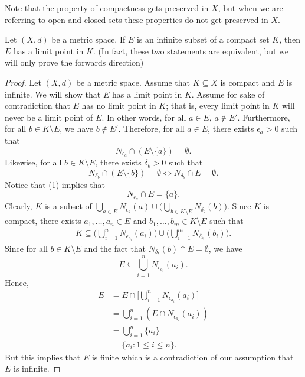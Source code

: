 \documentclass[a4paper]{report}
\begin{document}
Note that the property of compactness gets preserved in \( X  \), but when we are referring to open and closed sets these properties do not get preserved in \( X  \).

\begin{theorem}[ ]\label{Theorem 2.37}
   Let \( (X,d) \) be a metric space. If \( E  \) is an infinite subset of a compact set \( K  \), then \( E  \) has a limit point in \( K  \). (In fact, these two statements are equivalent, but we will only prove the forwards direction)
\end{theorem}
\begin{proof}
    Let \( (X,d) \) be a metric space. Assume that \( K \subseteq  X  \) is compact and \( E  \) is infinite. We will show that \( E  \) has a limit point in \( K  \). Assume for sake of contradiction that \( E  \) has no limit point in \( K  \); that is, every limit point in \( K \) will never be a limit point of \( E  \). In other words, for all \( a \in E  \), \( a \notin E' \). Furthermore, for all \( b \in K \setminus  E   \), we have \( b \notin E' \). Therefore, for all \( a \in E  \), there exists \( \epsilon_a > 0  \) such that 
    \[  {N}_{{\epsilon}_{a}} \cap (E \setminus  \{ a \} ) = \emptyset. \tag{1} \]
    Likewise, for all \( b \in K \setminus  E  \), there exists \( \delta_b  > 0  \) such that 
    \[  {N}_{{\delta}_{b}} \cap (E \setminus  \{ b \} ) = \emptyset \iff {N}_{{\delta}_{b}} \cap E = \emptyset. \tag{2} \]
Notice that (1) implies that 
\[  {N}_{{\epsilon}_{a}} \cap E = \{ a \}. \]
Clearly, \( K  \) is a subset of \( \bigcup_{ a \in E  }^{  }  {N}_{{\epsilon}_{a}} (a) \cup \Big(  \bigcup_{ b \in K \setminus  E  }^{  } {N}_{{\delta}_{b}}(b) \Big) \). Since \( K \) is compact, there exists \( {a}_{1}, \dots, {a}_{n} \in E  \) and \( {b}_{1}, \dots, {b}_{m} \in K \setminus  E  \) such that 
\begin{align*}
   K \subseteq  \Big(  \bigcup_{ i=1  }^{ n }  {N}_{{\epsilon}_{{a}_{i}}}({a}_{i}) \Big) \cup \Big(  \bigcup_{ i=1  }^{ m  } {N}_{{\delta}_{{b}_{i}}}({b}_{i}) \Big). 
\end{align*}
Since for all \( b \in K \setminus  E  \) and the fact that \( {N}_{{\delta}_{b}}(b) \cap E = \emptyset \), we have 
\[  E \subseteq \bigcup_{ i =1  }^{ n }  {N}_{{\epsilon}_{{a}_{i}}}({a}_{i}). \]
Hence, 
\begin{align*}
    E &= E \cap \Big[ \bigcup_{ i=1  }^{ n }  {N}_{{\epsilon}_{{a}_{i}}} ({a}_{i}) \Big]  \\
      &=  \bigcup_{ i=1  }^{ n }  ( E \cap {N}_{{\epsilon}_{{a}_{i}}}({a}_{i})) \\
      &= \bigcup_{ i=1  }^{ n }  \{ {a}_{i} \} \\
      &= \{ {a}_{i} : 1 \leq i \leq n \}.
\end{align*}
But this implies that \( E  \) is finite which is a contradiction of our assumption that \( E  \) is infinite.
\end{proof}
\end{document}
